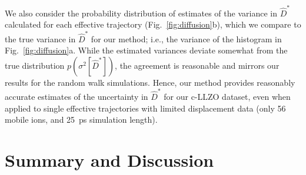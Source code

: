 \documentclass[reprint,superscriptaddress,nobibnotes,amsmath,amssymb,aps,prx,hidelinks]{revtex4-2}
\newcommand{\prob}[1]{\ensuremath{p(#1)}}
\newcommand{\Dest}{\ensuremath{\widehat{D}^*}}
\newcommand{\var}[1]{\ensuremath{\sigma^2[#1]}}
\begin{document}
We also consider the probability distribution of estimates of the variance in $\Dest$ calculated for each effective trajectory (Fig.~\ref{fig:diffusion}b), which we compare to the true variance in $\Dest$ for our method; i.e., the variance of the histogram in Fig.~\ref{fig:diffusion}a.
While the estimated variances deviate somewhat from the true distribution $\prob{\var{\Dest}}$, the agreement is reasonable and mirrors our results for the random walk simulations.
Hence, our method provides reasonably accurate estimates of the uncertainty in $\Dest$ for our c-LLZO dataset, even when applied to single effective trajectories with limited displacement data (only 56 mobile ions, and \SI{25}{ps} simulation length).


\section{Summary and Discussion}
\end{document}

